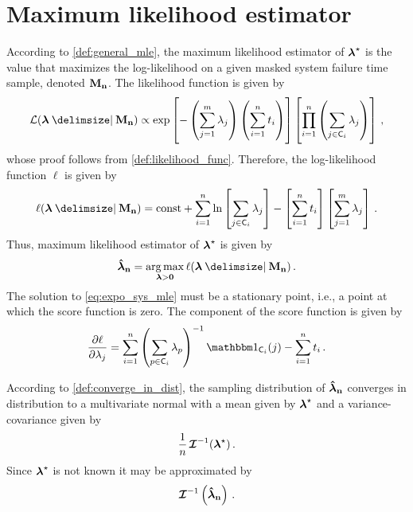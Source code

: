 \documentclass[
    11pt,
    extrafontsizes,
    article,
    oldfontcommands,
    final,
    oneside,
    openany,
    hidelinks]{memoir}
\begin{document}

\section{Maximum likelihood estimator}
According to \cref{def:general_mle}, the maximum likelihood estimator of ${\boldsymbol{\mathbf{\lambda}}}^{\star}$ is the value that maximizes the log-likelihood on a given masked system failure time sample, denoted $\boldsymbol{\mathbf{M_n}}$. The likelihood function is given by
\begin{equation}
\label{eq:expo_like}
\likelihood(\vec\lambda \Given \mfs) \propto
    \exp \left [ - \left ( \sum_{j=1}^{m} \lambda_j \right ) \left ( \sum_{i=1}^{n} t_i \right ) \right ]
    \left [ \prod_{i=1}^{n} \left ( \sum_{j \in \cand_i} \lambda_j \right ) \right ]\,,
\end{equation}
whose proof follows from \cref{def:likelihood_func}. Therefore, the log-likelihood function $\ell$ is given by
\begin{equation}
    \ell(\vec{\lambda} \Given \mfs) = \text{const} + \sum_{i=1}^{n} \ln \left [ \sum_{j \in \cand_i} \lambda_j \right ] - \left [ \sum_{i=1}^{n} t_i \right ] \left [ \sum_{j=1}^{m} \lambda_j \right ]\,.
\end{equation}
Thus, maximum likelihood estimator of ${\boldsymbol{\mathbf{\lambda}}}^{\star}$ is given by
\begin{equation}
\label{eq:expo_sys_mle}
    \expomle = \argmax_{\vec\lambda > \vec{0}} \ell(\vec\lambda \Given \mfs)\,.
\end{equation}
The solution to \cref{eq:expo_sys_mle} must be a stationary point, i.e., a point at which the score function is zero. The \jth component of the score function is given by
\begin{equation}
\label{eq:score_expo_j}
    \frac{\partial \ell}{\partial \lambda_j} = 
    \sum_{i=1}^{n} \left ( \sum_{p \in \cand_i} \lambda_p \right )^{-1} \SetIndicator{\cand_i}(j) - \sum_{i=1}^{n} t_i\,.
\end{equation}

According to \cref{def:converge_in_dist}, the sampling distribution of $\boldsymbol{\mathbf{\hat{\boldsymbol{\mathbf{\lambda}}}_n}}$ converges in distribution to a multivariate normal with a mean given by ${\boldsymbol{\mathbf{\lambda}}}^{\star}$ and a variance-covariance given by
\begin{equation}
    \frac{1}{n} \operatorname{\boldsymbol{\mathcal{I}}}^{-1}({\boldsymbol{\mathbf{\lambda}}}^{\star})\,.
\end{equation}
Since ${\boldsymbol{\mathbf{\lambda}}}^{\star}$ is not known it may be approximated by
\begin{equation}
    \operatorname{\boldsymbol{\mathcal{I}}}^{-1}\left(\boldsymbol{\mathbf{\hat{\boldsymbol{\mathbf{\lambda}}}_n}}\right)\,.
\end{equation}
\end{document}

